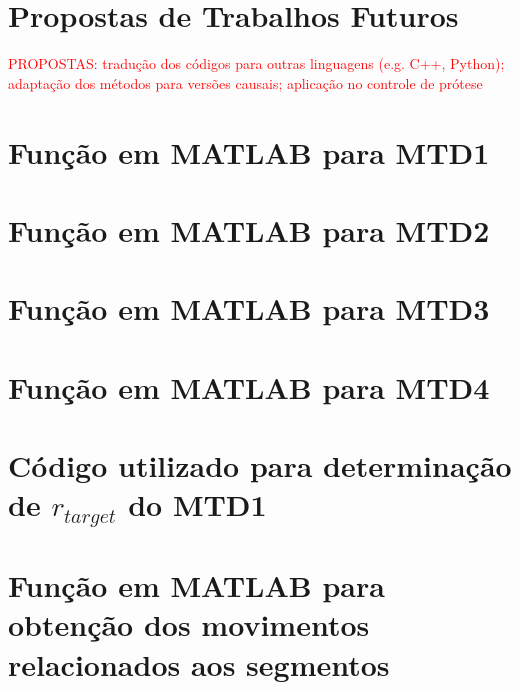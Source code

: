 	\chapter{Propostas de Trabalhos Futuros}

\textcolor{red}{PROPOSTAS: tradução dos códigos para outras linguagens (e.g. C++, Python); adaptação dos métodos para versões causais; aplicação no controle de prótese}

	\postextual
	

	\begin{apendicesenv}
	\partapendices
\chapter{Função em MATLAB para MTD1}

\label{ap:seg_mtd1}
\chapter{Função em MATLAB para MTD2}

\label{ap:seg_mtd2}
\chapter{Função em MATLAB para MTD3}

\label{ap:seg_mtd3}
\chapter{Função em MATLAB para MTD4}

\label{ap:seg_mtd4}
\chapter{Código utilizado para determinação de $r_{target}$ do MTD1}
\label{ap:r_target}

\chapter{Função em MATLAB para obtenção dos movimentos relacionados aos segmentos}
\label{ap:idMoves}

\end{apendicesenv}

